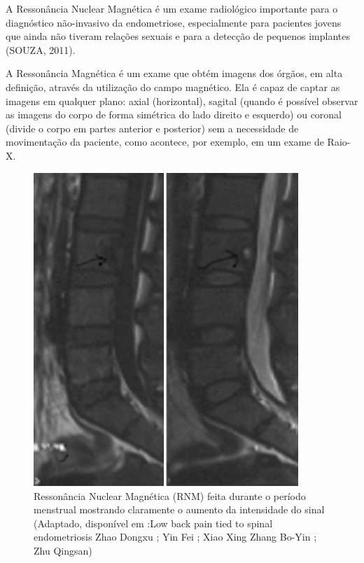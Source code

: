 \documentclass[12pt]{article} %
\begin{document}
A Ressonância Nuclear Magnética é um exame radiológico importante para o diagnóstico não-invasivo da endometriose, especialmente para pacientes jovens que ainda não tiveram relações sexuais e para a detecção de pequenos implantes (SOUZA, 2011).

A Ressonância Magnética é um exame que obtém imagens dos órgãos, em alta definição, através da utilização do campo magnético. Ela é capaz de captar as imagens em qualquer plano: axial (horizontal), sagital (quando é possível observar as imagens do corpo de forma simétrica do lado direito e esquerdo) ou coronal (divide o corpo em partes anterior e posterior) sem a necessidade de movimentação da paciente, como acontece, por exemplo, em um exame de Raio-X.

\begin{figure}[h!]
\centering
\includegraphics[width=10cm]{RNM.png}
\caption[Ressonância Nuclear Magnética (RNM) feita durante o período menstrual mostrando claramente o aumento da intensidade do sinal]{Ressonância Nuclear Magnética (RNM) feita durante o período menstrual mostrando claramente o aumento da intensidade do sinal (Adaptado, disponível em :Low back pain tied to spinal endometriosis
Zhao Dongxu ; Yin Fei ; Xiao Xing
Zhang Bo-Yin ; Zhu Qingsan)}
\end{figure}
\newpage
\end{document}
